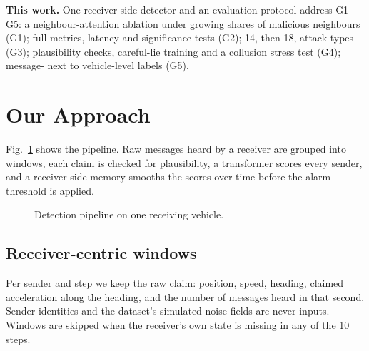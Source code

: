 \documentclass[conference]{IEEEtran}
\begin{document}
\textbf{This work.} One receiver-side detector and an evaluation protocol address G1--G5: a neighbour-attention ablation under growing
shares of malicious neighbours (G1); full metrics, latency and significance tests (G2); 14, then 18, attack types (G3); plausibility checks,
careful-lie training and a collusion stress test (G4); message- next to vehicle-level labels (G5).

\section{Our Approach}
\label{sec:approach}
Fig.~\ref{fig:pipeline} shows the pipeline. Raw messages heard by a receiver are grouped into windows, each claim is checked for plausibility,
a transformer scores every sender, and a receiver-side memory smooths the scores over time before the alarm threshold is applied.

\begin{figure}[t]\centering
{}
\caption{Detection pipeline on one receiving vehicle.}
\label{fig:pipeline}
\end{figure}

\subsection{Receiver-centric windows}
Per sender and step we keep the raw claim: position, speed, heading,
claimed acceleration along the heading, and the number of messages heard in that second. Sender identities and the dataset's simulated noise
fields are never inputs. Windows are skipped when the receiver's own state is missing in any of the 10 steps.
\end{document}
